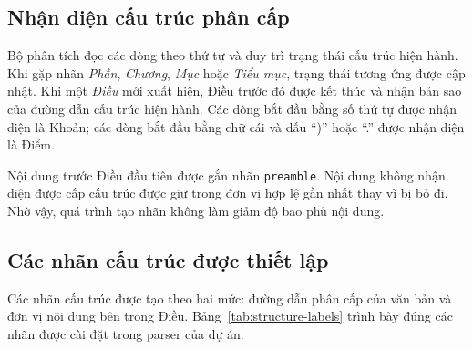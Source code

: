 \documentclass[12pt,a4paper]{article}
\newcommand{\code}[1]{\texttt{#1}}
\begin{document}
\subsection{Nhận diện cấu trúc phân cấp}

Bộ phân tích đọc các dòng theo thứ tự và duy trì trạng thái cấu trúc hiện hành.
Khi gặp nhãn \emph{Phần}, \emph{Chương}, \emph{Mục} hoặc \emph{Tiểu mục}, trạng
thái tương ứng được cập nhật. Khi một \emph{Điều} mới xuất hiện, Điều trước đó
được kết thúc và nhận bản sao của đường dẫn cấu trúc hiện hành. Các dòng bắt đầu
bằng số thứ tự được nhận diện là Khoản; các dòng bắt đầu bằng chữ cái và dấu
``)'' hoặc ``.'' được nhận diện là Điểm.

Nội dung trước Điều đầu tiên được gắn nhãn \code{preamble}. Nội dung không nhận
diện được cấp cấu trúc được giữ trong đơn vị hợp lệ gần nhất thay vì bị bỏ đi.
Nhờ vậy, quá trình tạo nhãn không làm giảm độ bao phủ nội dung.

\subsection{Các nhãn cấu trúc được thiết lập}

Các nhãn cấu trúc được tạo theo hai mức: đường dẫn phân cấp của văn bản và đơn
vị nội dung bên trong Điều. Bảng~\ref{tab:structure-labels} trình bày đúng các
nhãn được cài đặt trong parser của dự án.
\end{document}
